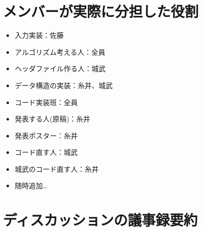 \documentclass[uplatex]{jsarticle}
\begin{document}
    \section{メンバーが実際に分担した役割}
    \begin{itemize}
        \item 入力実装：佐藤
        \item アルゴリズム考える人：全員
        \item ヘッダファイル作る人：城武
        \item データ構造の実装：糸井、城武
        \item コード実装班：全員
        \item 発表する人(原稿)：糸井
        \item 発表ポスター：糸井
        \item コード直す人：城武
        \item 城武のコード直す人：糸井
        \item 随時追加…
    \end{itemize}

    \section{ディスカッションの議事録要約}
\end{document}
